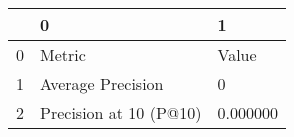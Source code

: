 \begin{tabular}{lll}
\toprule
 & 0 & 1 \\
\midrule
0 & Metric & Value \\
1 & Average Precision & 0 \\
2 & Precision at 10 (P@10) & 0.000000 \\
\bottomrule
\end{tabular}
